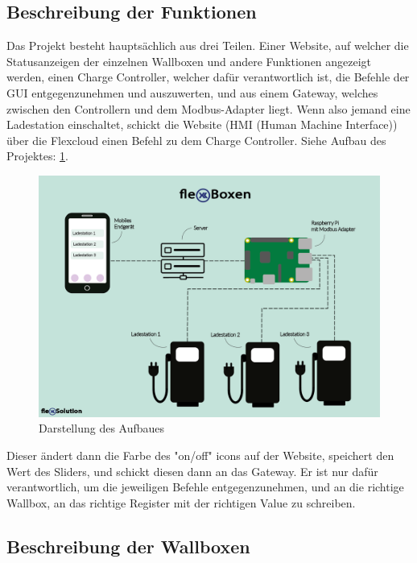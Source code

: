 \subsection{Beschreibung der Funktionen}
Das Projekt besteht hauptsächlich aus drei Teilen. Einer Website, auf welcher die Statusanzeigen der einzelnen Wallboxen und andere Funktionen angezeigt werden, einen Charge Controller, welcher dafür verantwortlich ist, die Befehle der GUI entgegenzunehmen und auszuwerten, und aus einem Gateway, welches zwischen den Controllern und dem Modbus-Adapter liegt. Wenn also jemand eine Ladestation einschaltet, schickt die Website (HMI (Human Machine Interface)) über die Flexcloud einen Befehl zu dem Charge Controller. 
Siehe Aufbau des Projektes: \ref{fig:impl:Infografik_FlexBoxen}.

  \begin{figure}[h t]
    \centering
    \includegraphics[scale=0.5]{pics/Infografik_FlexBoxen.png}
    \caption{Darstellung des Aufbaues}
    \label{fig:impl:Infografik_FlexBoxen}
\end{figure}

Dieser ändert dann die Farbe des "on/off" icons auf der Website, speichert den Wert des Sliders, und schickt diesen dann an das Gateway. Er ist nur dafür verantwortlich, um die jeweiligen Befehle entgegenzunehmen, und an die richtige Wallbox, an das richtige Register mit der richtigen Value zu schreiben. 





\subsection{Beschreibung der Wallboxen}

